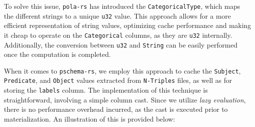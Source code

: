 To solve this issue, \texttt{pola-rs} has introduced the \texttt{CategoricalType}, which maps the different strings to a unique \texttt{u32} value. This approach allows for a more efficient representation of string values, optimizing cache performance and making it cheap to operate on the \texttt{Categorical} columns, as they are \texttt{u32} internally. Additionally, the conversion between \texttt{u32} and \texttt{String} can be easily performed once the computation is completed.

When it comes to \texttt{pschema-rs}, we employ this approach to cache the \texttt{Subject}, \texttt{Predicate}, and \texttt{Object} values extracted from \texttt{N-Triples} files, as well as for storing the \texttt{labels} column. The implementation of this technique is straightforward, involving a simple column cast. Since we utilize \textit{lazy evaluation}, there is no performance overhead incurred, as the cast is executed prior to materialization. An illustration of this is provided below:

\begin{code}
    \inputminted{rust}{code/listings/11-15_cast.rs}
\end{code}

